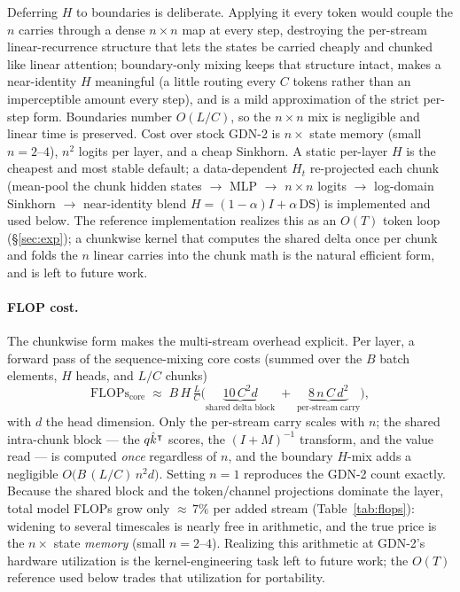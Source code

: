 \documentclass[11pt,letterpaper,logo]{yalearxiv}
\begin{document}
Deferring $H$ to boundaries is deliberate. Applying it every token would couple the
$n$ carries through a dense $n\times n$ map at every step, destroying the
per-stream linear-recurrence structure that lets the states be carried cheaply and
chunked like linear attention; boundary-only mixing keeps that structure intact,
makes a near-identity $H$ meaningful (a little routing every $C$ tokens rather than
an imperceptible amount every step), and is a mild approximation of the strict
per-step form. Boundaries number $O(L/C)$, so the $n\times n$ mix is negligible and
linear time is preserved. Cost over stock GDN-2 is $n\times$ state memory (small
$n = 2\text{--}4$), $n^2$ logits per layer, and a cheap Sinkhorn. A static
per-layer $H$ is the cheapest and most stable default; a data-dependent $H_t$
re-projected each chunk (mean-pool the chunk hidden states $\to$ MLP $\to$
$n{\times}n$ logits $\to$ log-domain Sinkhorn $\to$ near-identity blend
$H=(1-\alpha)I+\alpha\,\mathrm{DS}$) is implemented and used below. The reference
implementation realizes this as an $O(T)$ token loop (\S\ref{sec:exp}); a chunkwise
kernel that computes the shared delta once per chunk and folds the $n$ linear
carries into the chunk math is the natural efficient form, and is left to future
work.

\paragraph{FLOP cost.} The chunkwise form makes the multi-stream overhead
explicit. Per layer, a forward pass of the sequence-mixing core costs
(summed over the $B$ batch elements, $H$ heads, and $L/C$ chunks)
\begin{equation}
  \mathrm{FLOPs}_{\text{core}} \;\approx\; B\,H\,\tfrac{L}{C}\Big(
    \underbrace{10\,C^2 d}_{\text{shared delta block}} \;+\;
    \underbrace{8\,n\,C\,d^2}_{\text{per-stream carry}} \Big),
  \label{eq:flops}
\end{equation}
with $d$ the head dimension. Only the per-stream carry scales with $n$; the shared
intra-chunk block --- the $q\hat k^{\intercal}$ scores, the $(I{+}M)^{-1}$ transform, and
the value read --- is computed \emph{once} regardless of $n$, and the boundary
$H$-mix adds a negligible $O\!\big(B\,(L/C)\,n^2 d\big)$. Setting $n{=}1$ reproduces
the GDN-2 count exactly. Because the shared block and the token/channel projections
dominate the layer, total model FLOPs grow only ${\approx}\,7\%$ per added stream
(Table~\ref{tab:flops}): widening to several timescales is nearly free in
arithmetic, and the true price is the $n\times$ state \emph{memory} (small
$n=2\text{--}4$). Realizing this arithmetic at GDN-2's hardware utilization is the
kernel-engineering task left to future work; the $O(T)$ reference used below trades
that utilization for portability.
\end{document}
